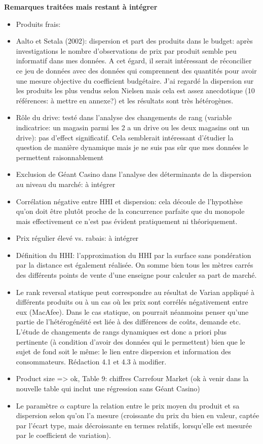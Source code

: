 \documentclass[11pt]{article}
\begin{document}
\textbf{Remarques traitées mais restant à intégrer}
\begin{itemize}
\item Produits frais: 
\item Aalto et Setala (2002): dispersion et part des produits dans le budget: après investigations le nombre d'observations de prix par produit semble peu informatif dans mes données. A cet égard, il serait intéressant de réconcilier ce jeu de données avec des données qui comprennent des quantités pour avoir une mesure objective du coefficient budgétaire. J'ai regardé la dispersion sur les produits les plus vendus selon Nielsen mais cela est assez anecdotique (10 références: à mettre en annexe?) et les résultats sont très hétérogènes.
\item Rôle du drive: testé dans l'analyse des changements de rang (variable indicatrice: un magasin parmi les 2 a un drive ou les deux magasins ont un drive): pas d'effect significatif. Cela semblerait intéressant d'étudier la question de manière dynamique mais je ne suis pas sûr que mes données le permettent raisonnablement
\item Exclusion de Géant Casino dans l'analyse des déterminants de la dispersion au niveau du marché: à intégrer
\item Corrélation négative entre HHI et dispersion: cela découle de l'hypothèse qu'on doit être plutôt proche de la concurrence parfaite que du monopole mais effectivement ce n'est pas évident pratiquement ni théoriquement.
\item Prix régulier élevé vs. rabais: à intégrer 
\item Définition du HHI: l'approximation du HHI par la surface sans pondération par la distance est également réalisée. On somme bien tous les mètres carrés des différents points de vente d'une enseigne pour calculer sa part de marché.
\item Le rank reversal statique peut correspondre au résultat de Varian appliqué à différents produits ou à un cas où les prix sont corrélés négativement entre eux (MacAfee). Dans le cas statique, on pourrait néanmoins penser qu'une partie de l'hétérogénéité est liée à des différences de coûts, demande etc. L'étude de changements de rangs dynamiques est donc a priori plus pertinente (à condition d'avoir des données qui le permettent) bien que le sujet de fond soit le même: le lien entre dispersion et information des consommateurs. Rédaction 4.1 et 4.3 à modifier.
\item Product size => ok, Table 9: chiffres Carrefour Market (ok à venir dans la nouvelle table qui inclut une régression sans Géant Casino)
\item Le paramètre $\alpha$ capture la relation entre le prix moyen du produit et sa dispersion selon qu'on l'a mesure (croissante du prix du bien en valeur, captée par l'écart type, mais décroissante en termes relatifs, lorsqu'elle est mesurée par le coefficient de variation).
\end{itemize}
\end{document}
